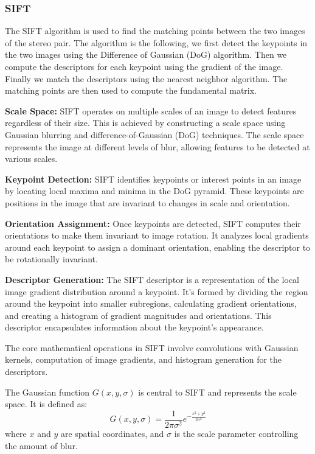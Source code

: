 \documentclass[10pt,twocolumn,letterpaper]{article}
\begin{document}
\subsubsection{SIFT}
The SIFT \cite{lindebergScaleInvariantFeature2012} algorithm is used to find the matching points between the two images of the stereo pair. The algorithm is the following, we first detect the keypoints in the two images using the Difference of Gaussian (DoG) algorithm. Then we compute the descriptors for each keypoint using the gradient of the image. Finally we match the descriptors using the nearest neighbor algorithm. The matching points are then used to compute the fundamental matrix.


\textbf{Scale Space:} SIFT operates on multiple scales of an image to detect features regardless of their size. This is achieved by constructing a scale space using Gaussian blurring and difference-of-Gaussian (DoG) techniques. The scale space represents the image at different levels of blur, allowing features to be detected at various scales.

\textbf{Keypoint Detection:} SIFT identifies keypoints or interest points in an image by locating local maxima and minima in the DoG pyramid. These keypoints are positions in the image that are invariant to changes in scale and orientation.

\textbf{Orientation Assignment:} Once keypoints are detected, SIFT computes their orientations to make them invariant to image rotation. It analyzes local gradients around each keypoint to assign a dominant orientation, enabling the descriptor to be rotationally invariant.

\textbf{Descriptor Generation:} The SIFT descriptor is a representation of the local image gradient distribution around a keypoint. It's formed by dividing the region around the keypoint into smaller subregions, calculating gradient orientations, and creating a histogram of gradient magnitudes and orientations. This descriptor encapsulates information about the keypoint's appearance.


The core mathematical operations in SIFT involve convolutions with Gaussian kernels, computation of image gradients, and histogram generation for the descriptors.

The Gaussian function $G(x, y, \sigma)$ is central to SIFT and represents the scale space. It is defined as:
\[ G(x, y, \sigma) = \frac{1}{2\pi\sigma^2} e^{-\frac{x^2 + y^2}{2\sigma^2}} \]
where $x$ and $y$ are spatial coordinates, and $\sigma$ is the scale parameter controlling the amount of blur.
\end{document}
